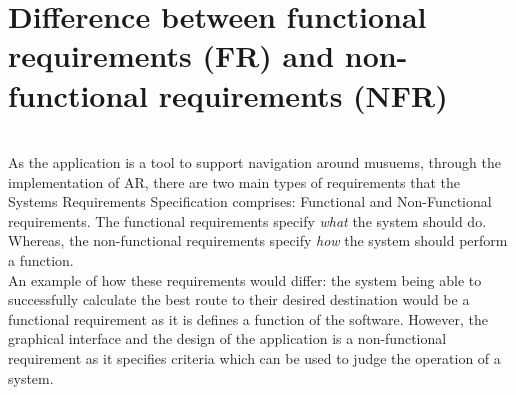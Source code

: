 

\section{Difference between functional requirements (FR) and non-functional requirements (NFR)}\\

As the application is a tool to support navigation around musuems, through the implementation of AR, there are two main types of requirements that the Systems Requirements Specification comprises: Functional and Non-Functional requirements. The functional requirements specify \textit{what} the system should do. Whereas, the non-functional requirements specify \textit{how} the system should perform a function.\\

An example of how these requirements would differ: the system being able to successfully calculate the best route to their desired destination would be a functional requirement as it is defines a function of the software. However, the graphical interface and the design of the application is a non-functional requirement as it specifies criteria which can be used to judge the operation of a system.



